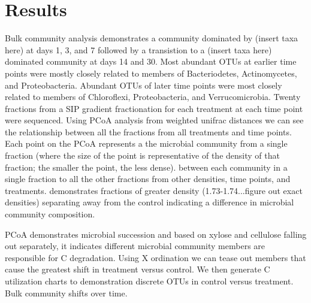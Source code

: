 \section{Results}

Bulk community analysis demonstrates a community dominated by (insert taxa here) at days 1, 3, and 7 followed by a transistion to a (insert taxa here) dominated community at days 14 and 30. Most abundant OTUs at earlier time points were mostly closely related to members of Bacteriodetes, Actinomycetes, and Proteobacteria.  Abundant OTUs of later time points were most closely related to members of Chloroflexi, Proteobacteria, and Verrucomicrobia.  Twenty fractions from a SIP gradient fractionation for each treatment at each time point were sequenced.  Using PCoA analysis from weighted unifrac distances we can see the relationship between all the fractions from all treatments and time points.  Each point on the PCoA represents a the microbial community from a single fraction (where the size of the point is representative of the density of that fraction; the smaller the point, the less dense).   
between each community in a single fraction to all the other fractions from other densities, time points, and treatments.  
demonstrates fractions of greater density (1.73-1.74...figure out exact densities) separating away from the control indicating a difference in microbial community composition.          

PCoA demonstrates microbial succession and based on xylose and cellulose falling out separately, it indicates different microbial community members are responsible for C degradation.  Using X ordination we can tease out members that cause the greatest shift in treatment versus control.  We then generate C utilization charts to demonstration discrete OTUs in control versus treatment.  Bulk community shifts over time.  
